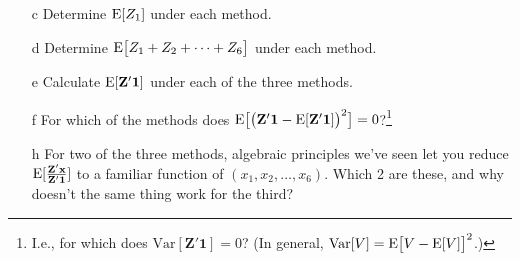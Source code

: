 \documentclass{article}
\begin{document}
\begin{enumerate}
\begin{minipage}{.45\linewidth}
\begin{itemize}
\item[c] Determine $\mathrm{E}[  Z_{1} ]$  under each method.
\item[d] Determine $\mathrm{E}\big[  Z_{1} + Z_{2} + \cdots + Z_{6} \big]$ under each method.
\item[e] Calculate $\mathrm{E}[\mathbf{Z}'\mathbf{1}]$ under each of the three methods.
\end{itemize}
\end{minipage}
% 
\begin{minipage}{.45\linewidth}
  \begin{itemize}
 \item[f] For which of the methods does $\mathrm{E}
  \big[\big(\mathbf{Z}'\mathbf{1} -\mathrm{E} [\mathbf{Z}'\mathbf{1}]\big)^{2}\big] =
  0$?\footnote{I.e., for which does
    $\mathrm{Var}[\mathbf{Z}'\mathbf{1}] = 0$?  (In general,
    $\mathrm{Var}[V] = \mathrm{E} \big[V - \mathrm{E}[V] \big]^{2} $.)}
\item[h] For two of the three methods, algebraic principles we've seen
  let you reduce
  $\mathrm{E} [\frac{\mathbf{Z}'\mathbf{x}}{\mathbf{Z}'\mathbf{1}}]$ to a
  familiar function of $(x_{1}, x_{2}, \ldots, x_{6}) $.  Which 2 are
  these, and why doesn't the same thing work for the third?

  \end{itemize}
\end{minipage}
\end{enumerate}
\end{document}
